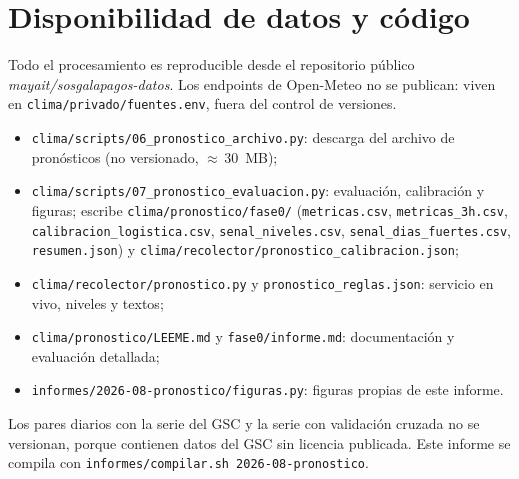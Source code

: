 \documentclass{sosg-informe}
\begin{document}
\section*{Disponibilidad de datos y código}
{\small Todo el procesamiento es reproducible desde el repositorio público \emph{mayait/sosgalapagos-datos}. Los endpoints de Open-Meteo no se publican: viven en \texttt{clima/privado/fuentes.env}, fuera del control de versiones.
\begin{itemize}
  \item \texttt{clima/scripts/06\_pronostico\_archivo.py}: descarga del archivo de pronósticos (no versionado, ${\approx}\,30$~MB);
  \item \texttt{clima/scripts/07\_pronostico\_evaluacion.py}: evaluación, calibración y figuras; escribe \texttt{clima/pronostico/fase0/} (\texttt{metricas.csv}, \texttt{metricas\_3h.csv}, \texttt{calibracion\_logistica.csv}, \texttt{senal\_niveles.csv}, \texttt{senal\_dias\_fuertes.csv}, \texttt{resumen.json}) y \texttt{clima/recolector/pronostico\_calibracion.json};
  \item \texttt{clima/recolector/pronostico.py} y \texttt{pronostico\_reglas.json}: servicio en vivo, niveles y textos;
  \item \texttt{clima/pronostico/LEEME.md} y \texttt{fase0/informe.md}: documentación y evaluación detallada;
  \item \texttt{informes/2026-08-pronostico/figuras.py}: figuras propias de este informe.
\end{itemize}
Los pares diarios con la serie del GSC y la serie con validación cruzada no se versionan, porque contienen datos del GSC sin licencia publicada. Este informe se compila con \texttt{informes/compilar.sh 2026-08-pronostico}.\par}



\end{document}
